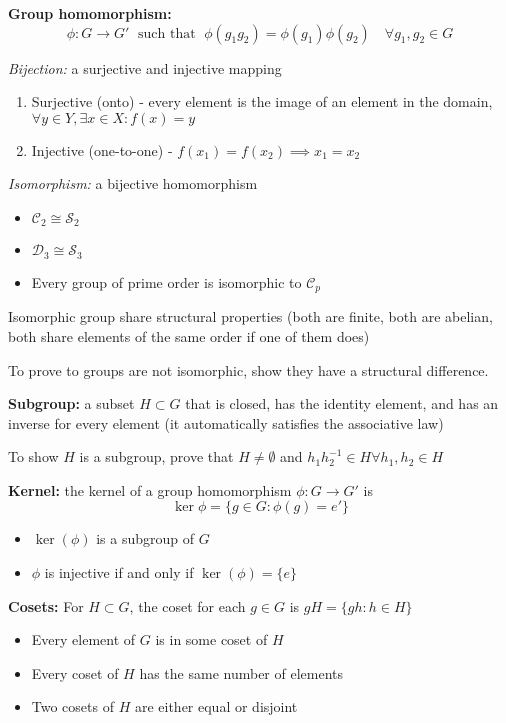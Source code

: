 \documentclass[12pt]{article}
\begin{document}
\textbf{Group homomorphism:}
\[\phi: G \to G' \;\text{ such that }\; \phi(g_1 g_2) = \phi(g_1)\phi(g_2) \quad \forall g_1, g_2 \in G \]

\emph{Bijection:} a surjective and injective mapping 
\begin{enumerate}
    \item Surjective (onto) - every element is the image of an element in the domain, $\forall y\in Y, \exists x \in X: f(x) = y$
    \item Injective (one-to-one) - $f(x_1) = f(x_2) \implies x_1 = x_2$
\end{enumerate}

\emph{Isomorphism:} a bijective homomorphism 
\begin{itemize}
    \item $\mathcal C_2 \cong \mathcal S_2$
    \item $\mathcal D_3 \cong \mathcal S_3$
    \item Every group of prime order is isomorphic to $\mathcal C_p$
\end{itemize}
Isomorphic group share structural properties (both are finite, both are abelian, both share elements of the same order if one of them does)

To prove to groups are not isomorphic, show they have a structural difference.

\textbf{Subgroup:} a subset $H \subset G$ that is closed, has the identity element, and has an inverse for every element (it automatically satisfies the associative law)

To show $H$ is a subgroup, prove that $H \neq \emptyset$ and $h_1h_2^{-1} \in H \forall h_1, h_2 \in H$

\textbf{Kernel:} the kernel of a group homomorphism $\phi: G\to G'$ is 
\[\ker \phi = \{g \in G: \phi(g) = e'\}\]
\begin{itemize}
    \item $\ker(\phi)$ is a subgroup of $G$
    \item $\phi$ is injective if and only if $\ker(\phi) = \{e\}$
\end{itemize}

\textbf{Cosets:} For $H \subset G$, the coset for each $g \in G$ is $gH = \{gh: h\in H\}$
\begin{itemize}
    \item Every element of $G$ is in some coset of $H$
    \item Every coset of $H$ has the same number of elements
    \item Two cosets of $H$ are either equal or disjoint  
\end{itemize}
\end{document}
